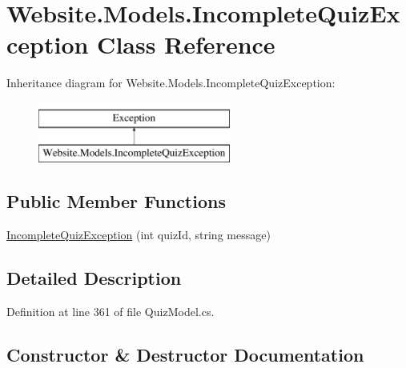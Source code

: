 \hypertarget{class_website_1_1_models_1_1_incomplete_quiz_exception}{}\section{Website.\+Models.\+Incomplete\+Quiz\+Exception Class Reference}
\label{class_website_1_1_models_1_1_incomplete_quiz_exception}
Inheritance diagram for Website.\+Models.\+Incomplete\+Quiz\+Exception\+:\begin{figure}[H]
\begin{center}
\leavevmode
\includegraphics[height=2.000000cm]{class_website_1_1_models_1_1_incomplete_quiz_exception}
\end{center}
\end{figure}
\subsection*{Public Member Functions}
\begin{DoxyCompactItemize}
\item 
\hyperlink{class_website_1_1_models_1_1_incomplete_quiz_exception_afda9c77bf284b38f33a84127f01240ed}{Incomplete\+Quiz\+Exception} (int quiz\+Id, string message)
\end{DoxyCompactItemize}


\subsection{Detailed Description}


Definition at line 361 of file Quiz\+Model.\+cs.



\subsection{Constructor \& Destructor Documentation}
\hypertarget{class_website_1_1_models_1_1_incomplete_quiz_exception_afda9c77bf284b38f33a84127f01240ed}{}
